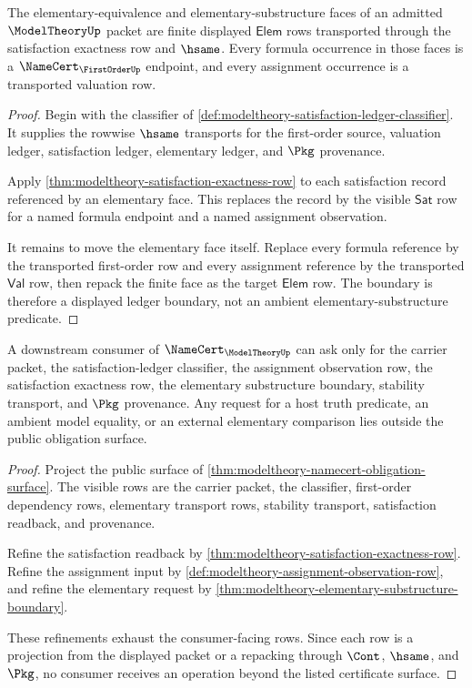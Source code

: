 \begin{theorem}\label{thm:modeltheory-elementary-substructure-boundary}
The elementary-equivalence and elementary-substructure faces of an admitted
$\ModelTheoryUp$ packet are finite displayed $\mathsf{Elem}$ rows transported
through the satisfaction exactness row and $\hsame$. Every formula occurrence
in those faces is a $\NameCert_{\FirstOrderUp}$ endpoint, and every assignment
occurrence is a transported valuation row.
\end{theorem}
\begin{proof}
Begin with the classifier of
\autoref{def:modeltheory-satisfaction-ledger-classifier}. It supplies the
rowwise $\hsame$ transports for the first-order source, valuation ledger,
satisfaction ledger, elementary ledger, and $\Pkg$ provenance.

Apply \autoref{thm:modeltheory-satisfaction-exactness-row} to each
satisfaction record referenced by an elementary face. This replaces the
record by the visible $\mathsf{Sat}$ row for a named formula endpoint and a
named assignment observation.

It remains to move the elementary face itself. Replace every formula
reference by the transported first-order row and every assignment reference
by the transported $\mathsf{Val}$ row, then repack the finite face as the
target $\mathsf{Elem}$ row. The boundary is therefore a displayed ledger
boundary, not an ambient elementary-substructure predicate.
\end{proof}

\begin{theorem}\label{thm:modeltheory-downstream-consumer-row}
A downstream consumer of $\NameCert_{\ModelTheoryUp}$ can ask only for the
carrier packet, the satisfaction-ledger classifier, the assignment
observation row, the satisfaction exactness row, the elementary substructure
boundary, stability transport, and $\Pkg$ provenance. Any request for a host
truth predicate, an ambient model equality, or an external elementary
comparison lies outside the public obligation surface.
\end{theorem}
\begin{proof}
Project the public surface of
\autoref{thm:modeltheory-namecert-obligation-surface}. The visible rows are
the carrier packet, the classifier, first-order dependency rows, elementary
transport rows, stability transport, satisfaction readback, and provenance.

Refine the satisfaction readback by
\autoref{thm:modeltheory-satisfaction-exactness-row}. Refine the assignment
input by \autoref{def:modeltheory-assignment-observation-row}, and refine the
elementary request by
\autoref{thm:modeltheory-elementary-substructure-boundary}.

These refinements exhaust the consumer-facing rows. Since each row is a
projection from the displayed packet or a repacking through $\Cont$,
$\hsame$, and $\Pkg$, no consumer receives an operation beyond the listed
certificate surface.
\end{proof}

